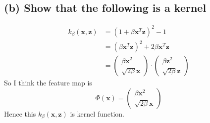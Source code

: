 \documentclass[12pt]{article}
\begin{document}
\subsection*{(b) Show that the following is a kernel}
$$
\begin{aligned}
k_{\beta}(\textbf{x},\textbf{z})&=(1+\beta \textbf{x}^T \textbf{z})^2-1\\
&=(\beta \textbf{x}^T \textbf{z})^2+2\beta \textbf{x}^T \textbf{z}\\
&=\left(
\begin{array}{c}
\beta\textbf{x}^2\\
\sqrt{2\beta}\textbf{x}
\end{array}
\right) \cdot
\left(
\begin{array}{c}
\beta\textbf{z}^2\\
\sqrt{2\beta}\textbf{z}
\end{array}
\right)
\end{aligned}
$$
So I think the feature map is 
$$
\Phi(\textbf{x})=
\left(
\begin{array}{c}
\beta\textbf{x}^2\\
\sqrt{2\beta}\textbf{x}
\end{array}
\right)
$$
Hence this $k_{\beta}(\textbf{x},\textbf{z})$ is kernel function.
\end{document}
